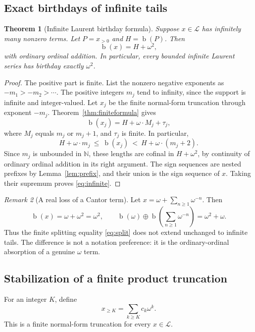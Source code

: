 \documentclass[11pt,letterpaper]{article}
\numberwithin{equation}{section}
\newtheorem{theorem}{Theorem}[section]
\theoremstyle{definition}
\theoremstyle{remark}
\newtheorem{remark}[theorem]{Remark}
\newcommand{\N}{\mathbb{N}}
\newcommand{\Lau}{\mathcal{L}}
\newcommand{\bd}{\operatorname{b}}
\newcommand{\ns}{\mathbin{\oplus}}
\begin{document}
\subsection{Exact birthdays of infinite tails}
\begin{theorem}[Infinite Laurent birthday formula]\label{thm:infinite}
Suppose $x\in\Lau$ has infinitely many nonzero terms. Let
$P=x_{>0}$ and $H=\bd(P)$. Then
\begin{equation}\label{eq:infinite}
 \boxed{\bd(x)=H+\omega^2,}
\end{equation}
with ordinary ordinal addition. In particular, every bounded infinite Laurent
series has birthday exactly $\omega^2$.
\end{theorem}
\begin{proof}
The positive part is finite. List the nonzero negative exponents as
$-m_1>-m_2>\cdots$. The positive integers $m_j$ tend to infinity, since the
support is infinite and integer-valued. Let $x_j$ be the finite normal-form
truncation through exponent $-m_j$.
Theorem~\ref{thm:finiteformula} gives
\[
 \bd(x_j)=H+\omega\cdot M_j+\tau_j,
\]
where $M_j$ equals $m_j$ or $m_j+1$, and $\tau_j$ is finite. In particular,
\[
 H+\omega\cdot m_j\ \leq\ \bd(x_j)
       \ <\ H+\omega\cdot(m_j+2).
\]
Since $m_j$ is unbounded in $\N$, these lengths are cofinal in
$H+\omega^2$, by continuity of ordinary ordinal addition in its right
argument. The sign sequences are nested prefixes by
Lemma~\ref{lem:prefix}, and their union is the sign sequence of $x$.
Taking their supremum proves \eqref{eq:infinite}.
\end{proof}

\begin{remark}[A real loss of a Cantor term]\label{rem:absorption}
Let $x=\omega+\sum_{n\geq1}\omega^{-n}$. Then
\[
 \bd(x)=\omega+\omega^2=\omega^2,
 \qquad
 \bd(\omega)\ns\bd\left(\sum_{n\geq1}\omega^{-n}\right)
 =\omega^2+\omega.
\]
Thus the finite splitting equality \eqref{eq:split} does not extend unchanged
to infinite tails. The difference is not a notation preference: it is the
ordinary-ordinal absorption of a genuine $\omega$ term.
\end{remark}

\subsection{Stabilization of a finite product truncation}
For an integer $K$, define
\[
 x_{\geq K}=\sum_{k\geq K}c_k\omega^k.
\]
This is a finite normal-form truncation for every $x\in\Lau$.
\end{document}
